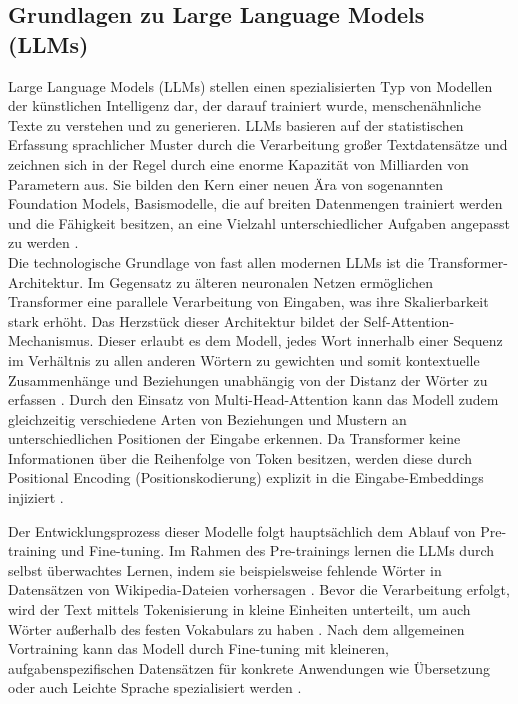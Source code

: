 
\subsection{Grundlagen zu Large Language Models (LLMs)}
Large Language Models (LLMs) stellen einen spezialisierten Typ von Modellen der künstlichen Intelligenz dar, der darauf trainiert wurde, menschenähnliche Texte zu verstehen und zu generieren.
LLMs basieren auf der statistischen Erfassung sprachlicher Muster durch die Verarbeitung großer Textdatensätze und zeichnen sich in der Regel durch eine enorme Kapazität von Milliarden von Parametern aus.
Sie bilden den Kern einer neuen Ära von sogenannten Foundation Models, Basismodelle, die auf breiten Datenmengen trainiert werden und die Fähigkeit besitzen, an eine Vielzahl unterschiedlicher Aufgaben angepasst zu werden \cite[S. 1, 3]{bommasani_opportunities_2022}.\\
Die technologische Grundlage von fast allen modernen LLMs ist die Transformer-Architektur.
Im Gegensatz zu älteren neuronalen Netzen ermöglichen Transformer eine parallele Verarbeitung von Eingaben, was ihre Skalierbarkeit stark erhöht.
Das Herzstück dieser Architektur bildet der Self-Attention-Mechanismus.
Dieser erlaubt es dem Modell, jedes Wort innerhalb einer Sequenz im Verhältnis zu allen anderen Wörtern zu gewichten und somit kontextuelle Zusammenhänge und Beziehungen unabhängig von der Distanz der Wörter zu erfassen \cite[S. 1-2]{vaswani_attention_nodate}.
Durch den Einsatz von Multi-Head-Attention kann das Modell zudem gleichzeitig verschiedene Arten von Beziehungen und Mustern an unterschiedlichen Positionen der Eingabe erkennen.
Da Transformer keine Informationen über die Reihenfolge von Token besitzen, werden diese durch Positional Encoding (Positionskodierung) explizit in die Eingabe-Embeddings injiziert \cite[S. 4-6]{vaswani_attention_nodate}.

Der Entwicklungsprozess dieser Modelle folgt hauptsächlich dem Ablauf von Pre-training und Fine-tuning.
Im Rahmen des Pre-trainings lernen die LLMs durch selbst überwachtes Lernen, indem sie beispielsweise fehlende Wörter in Datensätzen von Wikipedia-Dateien vorhersagen \cite[S. 1-20]{xiao_foundations_2025}.
Bevor die Verarbeitung erfolgt, wird der Text mittels Tokenisierung in kleine Einheiten unterteilt, um auch Wörter außerhalb des festen Vokabulars zu haben \cite[S. 228-229]{bluthgen_technische_2025}.
Nach dem allgemeinen Vortraining kann das Modell durch Fine-tuning mit kleineren, aufgabenspezifischen Datensätzen für konkrete Anwendungen wie Übersetzung oder auch Leichte Sprache spezialisiert werden \cite[S.42-46]{xiao_foundations_2025}.

